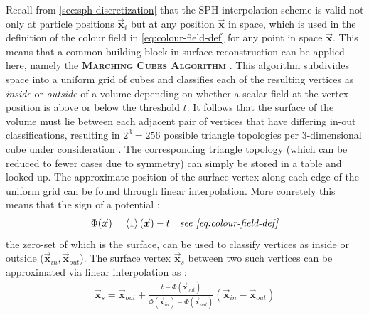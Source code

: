 \documentclass[oneside, a4paper]{book}
\newcommand\emphasis[1]{{\scshape\bfseries#1}}
\newcommand\angled[1]{\left\langle#1\right\rangle}
\newcommand\vek[1]{\vec{\bm{#1}}}
\newcommand\br[1]{\left(#1\right)}
\begin{document}
  Recall from \autoref{sec:sph-discretization} that the SPH interpolation scheme is valid not only at particle positions $\vek{x}_i$ but at any position $\vek{x}$ in space, which is used in the definition of the colour field in \autoref{eq:colour-field-def} for any point in space $\vek{x}$. This means that a common building block in surface reconstruction can be applied here, namely the \emphasis{Marching Cubes Algorithm} \autocite{marching-cubes}. This algorithm subdivides space into a uniform grid of cubes and classifies each of the resulting vertices as \textit{inside} or \textit{outside} of a volume depending on whether a scalar field at the vertex position is above or below the threshold $t$. It follows that the surface of the volume must lie between each adjacent pair of vertices that have differing in-out classifications, resulting in $2^3=256$ possible triangle topologies per 3-dimensional cube under consideration \autocite{marching-cubes}. The corresponding triangle topology (which can be reduced to fewer cases due to symmetry) can simply be stored in a table and looked up. The approximate position of the surface vertex along each edge of the uniform grid can be found through linear interpolation. More conretely this means that the sign of a potential \autocite{laplacian-surf-reconst}:
  \begin{align}
    \Phi(\vek{x}) &= \angled{1}\br{\vek{x}} - t &\textit{see \autoref{eq:colour-field-def}}
  \end{align} 
  the zero-set of which is the surface, can be used to classify vertices as inside or outside ($\vek{x}_{in}, \vek{x}_{out}$). The surface vertex $\vek{x}_s$ between two such vertices can be approximated via linear interpolation as \autocite{laplacian-surf-reconst}:
  \begin{align}
    \vek{x}_s = \vek{x}_{out} + \frac{t-\Phi(\vek{x}_{out})}{\Phi(\vek{x}_{in})-\Phi(\vek{x}_{out})} \br{\vek{x}_{in}-\vek{x}_{out}}
  \end{align}
  
\end{document}
